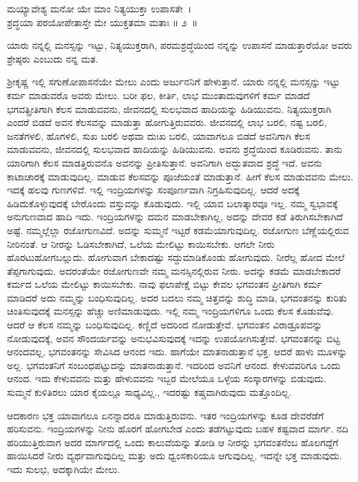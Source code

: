 \begin{shloka}
ಮಯ್ಯಾವೇಶ್ಯ ಮನೋ ಯೇ ಮಾಂ ನಿತ್ಯಯುಕ್ತಾ ಉಪಾಸತೇ~।\\ಶ್ರದ್ಧಯಾ ಪರಯೋಪೇತಾಸ್ತೇ ಮೇ ಯುಕ್ತತಮಾ ಮತಾಃ \hfill॥ ೨~॥
\end{shloka}

\begin{artha}
ಯಾರು ನನ್ನಲ್ಲಿ ಮನಸ್ಸನ್ನು ಇಟ್ಟು, ನಿತ್ಯಯುಕ್ತರಾಗಿ, ಪರಮಶ್ರದ್ಧೆಯಿಂದ ನನ್ನನ್ನು ಉಪಾಸನೆ ಮಾಡುತ್ತಾರೆಯೋ ಅವರು ಶ್ರೇಷ್ಠರು ಎಂಬುದು ನನ್ನ ಮತ.
\end{artha}

ಶ‍್ರೀಕೃಷ್ಣ ಇಲ್ಲಿ ಸಗುಣೋಪಾಸನೆಯೇ ಮೇಲು ಎಂದು ಅರ್ಜುನನಿಗೆ ಹೇಳುತ್ತಾನೆ. ಯಾರು ನನ್ನಲ್ಲಿ ಮನಸ್ಸನ್ನು ಇಟ್ಟು ಕರ್ಮ ಮಾಡುವರೊ ಅವರು ಮೇಲು. ಬರೀ ಫಲ, ಕೀರ್ತಿ, ಲಾಭ ಮುಂತಾದುವುಗಳಿಗೆ ಕರ್ಮ ಮಾಡದೆ ಭಗವತ್ಪ್ರೀತಿಗಾಗಿ ಕೆಲಸ ಮಾಡುವವನು, ಜೀವನದಲ್ಲಿ ಸುಲಭವಾದ ಹಾದಿಯನ್ನು ಹಿಡಿಯುವನು. ನಿತ್ಯಯುಕ್ತರಾಗಿ ಎಂದರೆ ಬಿಡದೆ ಅವನ ಕೆಲಸವನ್ನು ಮಾಡುತ್ತಾ ಹೋಗುತ್ತಿರುವವರು. ಜೀವನದಲ್ಲಿ ಲಾಭ ಬರಲಿ, ನಷ್ಟ ಬರಲಿ, ಜನತೆ\-ಗಳಲಿ, ಹೊಗಳಲಿ, ಸುಖ ಬರಲಿ ಅಥವಾ ದುಃಖ ಬರಲಿ, ಯಾವಾಗಲೂ ಬಿಡದೆ ಅವನಿಗಾಗಿ ಕೆಲಸ ಮಾಡುವವನು, ಜೀವನದಲ್ಲಿ ಸುಲಭವಾದ ಹಾದಿಯನ್ನು ಹಿಡಿಯುವನು. ಅವನು ಶ್ರದ್ಧೆಯಿಂದ ಕೂಡಿರುವನು. ತಾನು ಯಾರಿಗಾಗಿ ಕೆಲಸ ಮಾಡತ್ತಿರುವನೊ ಅವನನ್ನು ಪ್ರೀತಿಸುತ್ತಾನೆ. ಅವನಿಗಾಗಿ ಅದ್ಭುತವಾದ ಶ್ರದ್ಧೆ ಇದೆ. ಅವನು ಕಾಟಾಚಾರಕ್ಕೆ ಮಾಡುವುದಿಲ್ಲ. ಮಾಡುವ ಕೆಲಸವನ್ನು ಪೂಜೆಯಂತೆ ಮಾಡುತ್ತಾನೆ. ಹೀಗೆ ಕೆಲಸ ಮಾಡುವವನು ಮೇಲು. ಇದಕ್ಕೆ ಹಲವು ಗುಣಗಳಿವೆ. ಇಲ್ಲಿ ಇಂದ್ರಿಯಗಳನ್ನು ಸಂಪೂರ್ಣವಾಗಿ ನಿಗ್ರಹಿಸುವುದಿಲ್ಲ. ಆದರೆ ಅದಕ್ಕೆ ಹಿಡಿದುಕೊಳ್ಳುವುದಕ್ಕೆ ಬೇರೊಂದು ವಸ್ತುವನ್ನು ಕೊಡುವುದು. ಇಲ್ಲಿ ಯಾವ ಬಲಾತ್ಕಾರವೂ ಇಲ್ಲ. ನಮ್ಮ ಸ್ವಭಾವಕ್ಕೆ ಅನುಗುಣವಾದ ಹಾದಿ ಇದು. ಇಂದ್ರಿಯಗಳನ್ನು ದಮನ ಮಾಡಬೇಕಾಗಿಲ್ಲ, ಅದನ್ನು ದೇವರ ಕಡೆ ತಿರುಗಿಸಬೇಕಾಗಿದೆ ಅಷ್ಟೆ. ನಮ್ಮಲ್ಲೆಲ್ಲಾ ರಜೋಗುಣವಿದೆ. ಅದನ್ನು ಸುಮ್ಮನೆ ಇಟ್ಟರೆ ಕಡಮೆಯಾಗುವುದಿಲ್ಲ. ರಜೋಗುಣ ಬೆಣ್ಣೆಯಲ್ಲಿರುವ ನೀರಿನಂತೆ. ಆ ನೀರನ್ನು ಓಡಿಸಬೇಕಾಗಿದೆ, ಒಲೆಯ ಮೇಲಿಟ್ಟು \break ಕಾಯಿಸಬೇಕು. ಆಗಲೇ ನೀರು ಹೊರಟುಹೋಗಬಲ್ಲುದು. ಹೋಗುವಾಗ ಬೇಕಾದಷ್ಟು ಸದ್ದುಮಾಡಿಕೊಂಡು ಹೋಗುವುದು. ನೀರೆಲ್ಲ ಹೋದ ಮೇಲೆ ತೆಪ್ಪಗಾಗುವುದು. ಅದರಂತೆಯೇ ರಜೋಗುಣವೇ ನಮ್ಮ ಮನಸ್ಸಿನಲ್ಲಿರುವ ನೀರು. ಅದನ್ನು ಕಡಮೆ ಮಾಡಬೇಕಾದರೆ ಕರ್ಮದ ಒಲೆಯ ಮೇಲಿಟ್ಟು ಕಾಯಿಸಬೇಕು. ನಾವು ಫಲಾಪೇಕ್ಷೆ ಬಿಟ್ಟು ಕೇವಲ ಭಗವಂತನ ಪ್ರೀತಿಗಾಗಿ ಕರ್ಮ ಮಾಡಿದರೆ ಅದು ನಮ್ಮನ್ನು ಬಂಧಿಸುವುದಿಲ್ಲ. ಅದರ ಬದಲು ನಮ್ಮ ಚಿತ್ತವನ್ನು ಶುದ್ಧಿ ಮಾಡಿ, ಭಗವಂತನನ್ನು ಕುರಿತು ಚಿಂತಿಸುವುದಕ್ಕೆ ಮನಸ್ಸನ್ನು ಹೆಚ್ಚು ಅಣಿಮಾಡುವುದು. ಇಲ್ಲಿ ನಮ್ಮ ಇಂದ್ರಿಯಗಳಿಗೂ ಒಂದು ಕೆಲಸ ಕೊಡುವೆವು. ಆದರೆ ಆ ಕೆಲಸ ನಮ್ಮನ್ನು ಬಂಧಿಸುವುದಿಲ್ಲ. ಕಣ್ಣಿದೆ ಅದರಿಂದ ನೋಡುತ್ತೇವೆ. ಭಗವಂತನ ವಿರಾಡ್ರೂಪವನ್ನು ನೋಡುವುದಕ್ಕೆ, ಅವನ ಸೌಂದರ್ಯವನ್ನು ಅನುಭವಿಸುವುದಕ್ಕೆ ಇದನ್ನು ಉಪಯೋಗಿಸುತ್ತೇವೆ. ಭಗವಂತನನ್ನು ಬಿಟ್ಟ ಆನಂದವಲ್ಲ, ಭಗವಂತನನ್ನು ಸೇವಿಸಿದ ಆನಂದ ಇದು. ಹಾಗೆಯೇ ಮಾತನಾಡುತ್ತಾನೆ ಭಕ್ತ. ಆದರೆ ಹಾಳು ಮೂಳನ್ನು ಅಲ್ಲ. ಭಗವಂತನಿಗೆ ಸಂಬಂಧಪಟ್ಟುದನ್ನು ಮಾತನಾಡುತ್ತಾನೆ. ಇದರಿಂದ ಅವನಿಗೆ ಆನಂದ. ಕೇಳುವವರಿಗೂ ಒಂದು ಆನಂದ. ಇದು ಕೇಳುವವನು ಮತ್ತು ಹೇಳುವವನು ಇಬ್ಬರ ಮೇಲೆಯೂ ಒಳ್ಳೆಯ ಸಂಸ್ಕಾರಗಳನ್ನು ಬಿಡುವುದು. ಸುಮ್ಮನೆ ಕುಳಿತಿರಲು ಯಾರ ಕೈಯಲ್ಲೂ ಸಾಧ್ಯವಿಲ್ಲ., ಇದರಷ್ಟು ಕಷ್ಚವಾಗಿರುವುದು ಮತ್ತೊಂದಿಲ್ಲ.

ಆದಕಾರಣ ಭಕ್ತ ಯಾವಾಗಲೂ ಏನನ್ನಾದರೂ ಮಾಡುತ್ತಿರುವನು. ಇತರ ಇಂದ್ರಿಯಗಳನ್ನು ಕೂಡ ದೇವರೆಡೆಗೆ ಹರಿಸುವನು. ಇಂದ್ರಿಯಗಳನ್ನು ನೀನು ಹೊರಗೆ ಹೋಗಬೇಡ ಎಂದು ತಡೆಗಟ್ಟುವುದು ಬಹಳ ಕಷ್ಟವಾದ ಮಾರ್ಗ. ನದಿ ಹರಿಯುತ್ತಿರುವಾಗ ಅದರ ಮಾರ್ಗದಲ್ಲಿ ಒಂದು ಕಾಲುವೆಯನ್ನು ತೋಡಿ ಆ ನೀರನ್ನು ಭಗವಂತನೆಂಬ ಹೊಲಗದ್ದೆಗೆ ಹಾಯಿಸಿದರೆ ನೀರು ವ್ಯರ್ಥವಾಗುವುದಿಲ್ಲ ಮತ್ತು ಅದು ಧ್ವಂಸಕಾರಿಯೂ ಆಗುವುದಿಲ್ಲ. ಇದನ್ನೇ ಭಕ್ತ ಮಾಡುವುದು. ಇದು ಸುಲಭ, ಅದಕ್ಕಾಗಿಯೇ ಮೇಲು.

